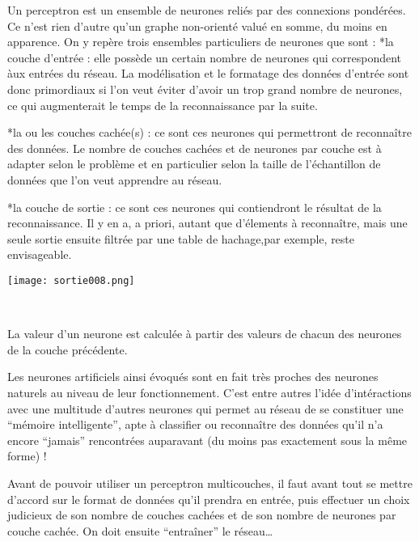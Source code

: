 Un perceptron est un ensemble de neurones reli\'es par des connexions
pond\'er\'ees. Ce n'est rien d'autre qu'un graphe non-orient\'e valu\'e
en somme, du moins en apparence. On y rep\`ere trois ensembles
particuliers de neurones que sont : 
*la couche d'entr\'ee : elle poss\`ede un certain nombre de neurones qui
correspondent \`aux entr\'ees du r\'eseau. La mod\'elisation et le
formatage des donn\'ees d'entr\'ee sont donc primordiaux si l'on veut
\'eviter d'avoir un trop grand nombre de neurones, ce qui augmenterait
le temps de la reconnaissance par la suite.

*la ou les couches cach\'ee(s) : ce sont ces neurones qui permettront de
reconna\^itre des donn\'ees. Le nombre de couches cach\'ees et de
neurones par couche est \`a adapter selon le probl\`eme et en
particulier selon la taille de l'\'echantillon de donn\'ees que l'on veut
apprendre au r\'eseau.

*la couche de sortie : ce sont ces neurones qui contiendront le
r\'esultat de la reconnaissance. Il y en a, a priori, autant que
d'\'elements \`a reconna\^itre, mais une seule sortie ensuite filtr\'ee
par une table de hachage,par exemple, reste envisageable.


\begin{center}
	
	\texttt{[image: sortie008.png]}\\
	\caption{\emph{Perceptron \`a une sortie}}\\
\end{center}





La valeur d'un neurone est calcul\'ee \`a partir des valeurs de chacun
des neurones de la couche pr\'ec\'edente.

Les neurones artificiels ainsi \'evoqu\'es sont en fait tr\`es proches
des neurones naturels au niveau de leur fonctionnement. C'est entre
autres l'id\'ee d'int\'eractions avec une multitude d'autres neurones
qui permet au r\'eseau de se constituer une ``m\'emoire intelligente'',
apte \`a classifier ou reconna\^itre des donn\'ees qu'il n'a encore
``jamais'' rencontr\'ees auparavant (du moins pas exactement sous la
même forme) !

Avant de pouvoir utiliser un perceptron multicouches, il faut avant tout se mettre d'accord sur le
format de donn\'ees qu'il prendra en entr\'ee, puis effectuer un choix
judicieux de son nombre de couches cach\'ees et de son nombre de neurones
par couche cach\'ee. On doit ensuite ``entra\^iner'' le r\'eseau\ldots

